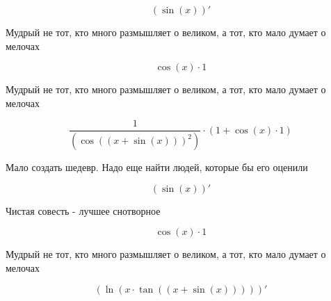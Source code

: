 \documentclass[a4paper,12pt]{article}
\begin{document}
\begin{center}
\begin{equation}
(\sin(x))'
\end{equation}
\end{center}

\begin{center}
Мудрый не тот, кто много размышляет о великом, а тот, кто мало думает о мелочах
\end{center}

\begin{center}
\begin{equation}
\cos(x) \cdot 1
\end{equation}
\end{center}

\begin{center}
Мудрый не тот, кто много размышляет о великом, а тот, кто мало думает о мелочах
\end{center}

\begin{center}
\begin{equation}
 \frac{1 }{ (\cos((x + \sin(x)))^{2}) }  \cdot (1 + \cos(x) \cdot 1)
\end{equation}
\end{center}

\begin{center}
Мало создать шедевр. Надо еще найти людей, которые бы его оценили
\end{center}

\begin{center}
\begin{equation}
(\sin(x))'
\end{equation}
\end{center}

\begin{center}
Чистая совесть - лучшее снотворное
\end{center}

\begin{center}
\begin{equation}
\cos(x) \cdot 1
\end{equation}
\end{center}

\begin{center}
Мудрый не тот, кто много размышляет о великом, а тот, кто мало думает о мелочах
\end{center}

\begin{center}
\begin{equation}
(\ln(x \cdot \tan((x + \sin(x)))))'
\end{equation}
\end{center}
\end{document}

